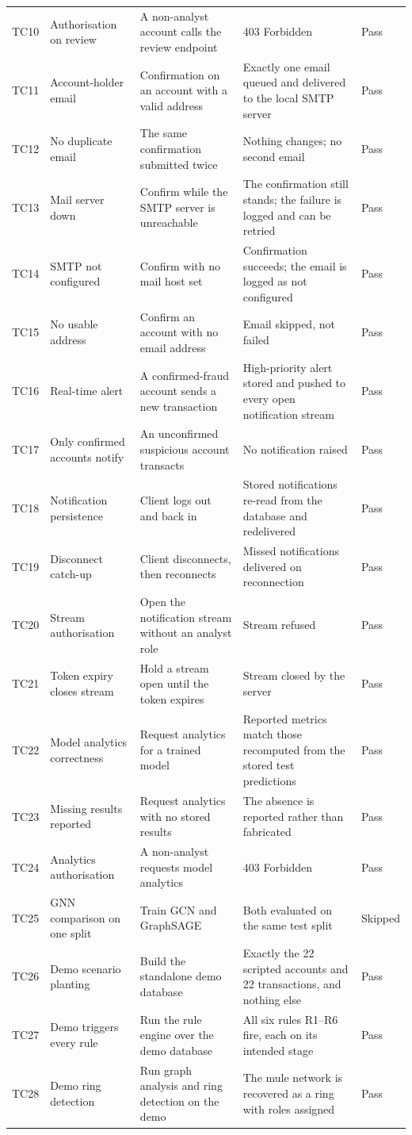 \begin{longtable}{@{}L{1.0cm}L{2.9cm}L{3.5cm}L{3.5cm}L{1.3cm}@{}}
TC10 & Authorisation on review & A non-analyst account calls the review endpoint & 403 Forbidden & Pass \\
TC11 & Account-holder email & Confirmation on an account with a valid address & Exactly one email queued and delivered to the local SMTP server & Pass \\
TC12 & No duplicate email & The same confirmation submitted twice & Nothing changes; no second email & Pass \\
TC13 & Mail server down & Confirm while the SMTP server is unreachable & The confirmation still stands; the failure is logged and can be retried & Pass \\
TC14 & SMTP not configured & Confirm with no mail host set & Confirmation succeeds; the email is logged as not configured & Pass \\
TC15 & No usable address & Confirm an account with no email address & Email skipped, not failed & Pass \\
TC16 & Real-time alert & A confirmed-fraud account sends a new transaction & High-priority alert stored and pushed to every open notification stream & Pass \\
TC17 & Only confirmed accounts notify & An unconfirmed suspicious account transacts & No notification raised & Pass \\
TC18 & Notification persistence & Client logs out and back in & Stored notifications re-read from the database and redelivered & Pass \\
TC19 & Disconnect catch-up & Client disconnects, then reconnects & Missed notifications delivered on reconnection & Pass \\
TC20 & Stream authorisation & Open the notification stream without an analyst role & Stream refused & Pass \\
TC21 & Token expiry closes stream & Hold a stream open until the token expires & Stream closed by the server & Pass \\
TC22 & Model analytics correctness & Request analytics for a trained model & Reported metrics match those recomputed from the stored test predictions & Pass \\
TC23 & Missing results reported & Request analytics with no stored results & The absence is reported rather than fabricated & Pass \\
TC24 & Analytics authorisation & A non-analyst requests model analytics & 403 Forbidden & Pass \\
TC25 & GNN comparison on one split & Train GCN and GraphSAGE & Both evaluated on the same test split & Skipped \\
TC26 & Demo scenario planting & Build the standalone demo database & Exactly the 22 scripted accounts and 22 transactions, and nothing else & Pass \\
TC27 & Demo triggers every rule & Run the rule engine over the demo database & All six rules R1--R6 fire, each on its intended stage & Pass \\
TC28 & Demo ring detection & Run graph analysis and ring detection on the demo & The mule network is recovered as a ring with roles assigned & Pass \\
\end{longtable}
